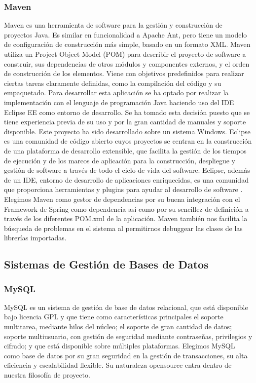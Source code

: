 \documentclass[12pt, a4paper, twoside]{book}
\begin{document}
	\subsubsection{Maven}
	Maven es una herramienta de software para la gestión y construcción de
	proyectos Java. Es similar en funcionalidad a Apache Ant, pero tiene un modelo
	de configuración de construcción más simple, basado en un formato XML.
	Maven utiliza un Project Object Model (POM) para describir el proyecto de
	software a construir, sus dependencias de otros módulos y componentes externos,
	y el orden de construcción de los elementos. Viene con objetivos predefinidos para
	realizar ciertas tareas claramente definidas, como la compilación del código y su
	empaquetado.
	Para desarrollar esta aplicación se ha optado por realizar la implementación con el lenguaje de programación Java haciendo uso del IDE Eclipse EE como entorno de desarrollo. Se ha tomado esta decisión puesto que se tiene experiencia previa de su uso y por la gran cantidad de manuales y soporte disponible. Este proyecto ha sido desarrollado sobre un sistema Windows.
	Eclipse es una comunidad de código abierto cuyos proyectos se centran en la construcción de una plataforma de desarrollo extensible, que facilita la gestión de los tiempos de ejecución y de los marcos de aplicación para la construcción, despliegue y gestión de software a través de todo el ciclo de vida del software. Eclipse, además de un IDE, entorno de desarrollo de aplicaciones enriquecidas, es una comunidad que proporciona herramientas y plugins para ayudar al desarrollo de software \cite{Maven}.
	Elegimos Maven como gestor de dependencias por su buena integración con el Framework de Spring como dependencia así como por su sencillez de definición a través de los diferentes POM.xml de la aplicación. Maven también nos facilita la búsqueda de problemas en el sistema al permitirnos debuggear las clases de las librerías importadas.
	\subsection{Sistemas de Gestión de Bases de Datos}
	\subsubsection{MySQL}
	MySQL es un sistema de gestión de base de datos relacional, que está disponible
	bajo licencia GPL y que tiene como características principales el soporte multitarea,
	mediante hilos del núcleo; el soporte de gran cantidad de datos; soporte multiusuario,
	con gestión de seguridad mediante contraseñas, privilegios y cifrado; y que está
	disponible sobre múltiples plataformas.\cite{MySQL}
	Elegimos MySQL como base de datos por su gran seguridad en la gestión de transacciones, su alta eficiencia y escalabilidad flexible. Su naturaleza opensource entra dentro de nuestra filosofía de proyecto.
\end{document}
